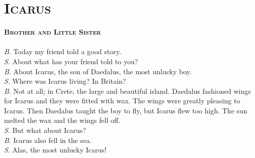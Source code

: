 \documentclass[12pt]{article}
\begin{document}
\section{\textsc{Icarus}}
\textsc{\textbf{Brother and Little Sister}} \\ \\
\textsc{\textit{B}}. Today my friend told a good story. \\
\textsc{\textit{S}}. About what has your friend told to you? \\
\textsc{\textit{B}}. About Icarus, the son of Daedalus, the most unlucky boy. \\
\textsc{\textit{S}}. Where was Icarus living? In Britain? \\
\textsc{\textit{B}}. Not at all; in Crete, the large and beautiful island. Daedalus fashioned wings for Icarus and they were fitted with wax. The wings were greatly pleasing to Icarus. Then Daedalus taught the boy to fly, but Icarus flew too high. The sun melted the wax and the wings fell off. \\
\textsc{\textit{S}}. But what about Icarus? \\
\textsc{\textit{B}}. Icarus also fell in the sea. \\
\textsc{\textit{S}}. Alas, the most unlucky Icarus!
\end{document}
